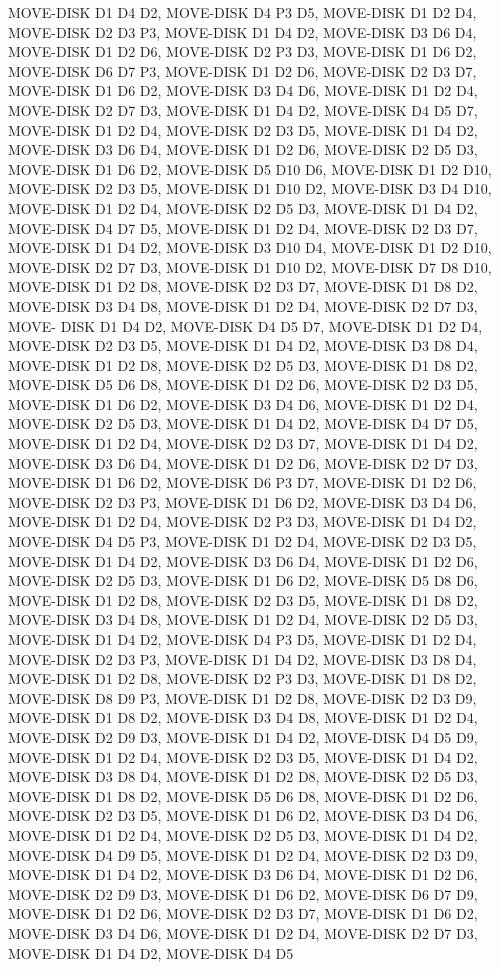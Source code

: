\documentclass[12pt]{article}
\begin{document}
\begin{appendix}
\begin{itemize}
MOVE-DISK D1 D4 D2,  MOVE-DISK D4 P3 D5,  MOVE-DISK D1 D2 D4,  MOVE-DISK D2 D3 P3,  MOVE-DISK D1 D4 D2,  MOVE-DISK D3 D6 D4,  MOVE-DISK D1 D2 D6,  MOVE-DISK D2 P3 D3,  MOVE-DISK D1 D6 D2,  MOVE-DISK D6 D7 P3,  MOVE-DISK D1 D2 D6,  MOVE-DISK D2 D3 D7,  MOVE-DISK D1 D6 D2,  MOVE-DISK D3 D4 D6,  MOVE-DISK D1 D2 D4,  MOVE-DISK D2 D7 D3,  MOVE-DISK D1 D4 D2,  MOVE-DISK D4 D5 D7,  MOVE-DISK D1 D2 D4,  MOVE-DISK D2 D3 D5,  MOVE-DISK D1 D4 D2,  MOVE-DISK D3 D6 D4,  MOVE-DISK D1 D2 D6,  MOVE-DISK D2 D5 D3,  MOVE-DISK D1 D6 D2,  MOVE-DISK D5 D10 D6,  MOVE-DISK D1 D2 D10,  MOVE-DISK D2 D3 D5,  MOVE-DISK D1 D10 D2,  MOVE-DISK D3 D4 D10,  MOVE-DISK D1 D2 D4,  MOVE-DISK D2 D5 D3,  MOVE-DISK D1 D4 D2,  MOVE-DISK D4 D7 D5,  MOVE-DISK D1 D2 D4,  MOVE-DISK D2 D3 D7,  MOVE-DISK D1 D4 D2,  MOVE-DISK D3 D10 D4,  MOVE-DISK D1 D2 D10,  MOVE-DISK D2 D7 D3,  MOVE-DISK D1 D10 D2,  MOVE-DISK D7 D8 D10,  MOVE-DISK D1 D2 D8,  MOVE-DISK D2 D3 D7,  MOVE-DISK D1 D8 D2,  MOVE-DISK D3 D4 D8,  MOVE-DISK D1 D2 D4,  MOVE-DISK D2 D7 D3,  MOVE-
DISK D1 D4 D2,  MOVE-DISK D4 D5 D7,  MOVE-DISK D1 D2 D4,  MOVE-DISK D2 D3 D5,  MOVE-DISK D1 D4 D2,  MOVE-DISK D3 D8 D4,  MOVE-DISK D1 D2 D8,  MOVE-DISK D2 D5 D3,  MOVE-DISK D1 D8 D2,  MOVE-DISK D5 D6 D8,  MOVE-DISK D1 D2 D6,  MOVE-DISK D2 D3 D5,  MOVE-DISK D1 D6 D2,  MOVE-DISK D3 D4 D6,  MOVE-DISK D1 D2 D4,  MOVE-DISK D2 D5 D3,  MOVE-DISK D1 D4 D2,  MOVE-DISK D4 D7 D5,  MOVE-DISK D1 D2 D4,  MOVE-DISK D2 D3 D7,  MOVE-DISK D1 D4 D2,  MOVE-DISK D3 D6 D4,  MOVE-DISK D1 D2 D6,  MOVE-DISK D2 D7 D3,  MOVE-DISK D1 D6 D2,  MOVE-DISK D6 P3 D7,  MOVE-DISK D1 D2 D6,  MOVE-DISK D2 D3 P3,  MOVE-DISK D1 D6 D2,  MOVE-DISK D3 D4 D6,  MOVE-DISK D1 D2 D4,  MOVE-DISK D2 P3 D3,  MOVE-DISK D1 D4 D2,  MOVE-DISK D4 D5 P3,  MOVE-DISK D1 D2 D4,  MOVE-DISK D2 D3 D5,  MOVE-DISK D1 D4 D2,  MOVE-DISK D3 D6 D4,  MOVE-DISK D1 D2 D6,  MOVE-DISK D2 D5 D3,  MOVE-DISK D1 D6 D2,  MOVE-DISK D5 D8 D6,  MOVE-DISK D1 D2 D8,  MOVE-DISK D2 D3 D5,  MOVE-DISK D1 D8 D2,  MOVE-DISK D3 D4 D8,  MOVE-DISK D1 D2 D4,  MOVE-DISK D2 D5 D3,  MOVE-DISK D1 D4 D2,  
MOVE-DISK D4 P3 D5,  MOVE-DISK D1 D2 D4,  MOVE-DISK D2 D3 P3,  MOVE-DISK D1 D4 D2,  MOVE-DISK D3 D8 D4,  MOVE-DISK D1 D2 D8,  MOVE-DISK D2 P3 D3,  MOVE-DISK D1 D8 D2,  MOVE-DISK D8 D9 P3,  MOVE-DISK D1 D2 D8,  MOVE-DISK D2 D3 D9,  MOVE-DISK D1 D8 D2,  MOVE-DISK D3 D4 D8,  MOVE-DISK D1 D2 D4,  MOVE-DISK D2 D9 D3,  MOVE-DISK D1 D4 D2,  MOVE-DISK D4 D5 D9,  MOVE-DISK D1 D2 D4,  MOVE-DISK D2 D3 D5,  MOVE-DISK D1 D4 D2,  MOVE-DISK D3 D8 D4,  MOVE-DISK D1 D2 D8,  MOVE-DISK D2 D5 D3,  MOVE-DISK D1 D8 D2,  MOVE-DISK D5 D6 D8,  MOVE-DISK D1 D2 D6,  MOVE-DISK D2 D3 D5,  MOVE-DISK D1 D6 D2,  MOVE-DISK D3 D4 D6,  MOVE-DISK D1 D2 D4,  MOVE-DISK D2 D5 D3,  MOVE-DISK D1 D4 D2,  MOVE-DISK D4 D9 D5,  MOVE-DISK D1 D2 D4,  MOVE-DISK D2 D3 D9,  MOVE-DISK D1 D4 D2,  MOVE-DISK D3 D6 D4,  MOVE-DISK D1 D2 D6,  MOVE-DISK D2 D9 D3,  MOVE-DISK D1 D6 D2,  MOVE-DISK D6 D7 D9,  MOVE-DISK D1 D2 D6,  MOVE-DISK D2 D3 D7,  MOVE-DISK D1 D6 D2,  MOVE-DISK D3 D4 D6,  MOVE-DISK D1 D2 D4,  MOVE-DISK D2 D7 D3,  MOVE-DISK D1 D4 D2,  MOVE-DISK D4 D5 

\end{itemize}
\end{appendix}
\end{document}
